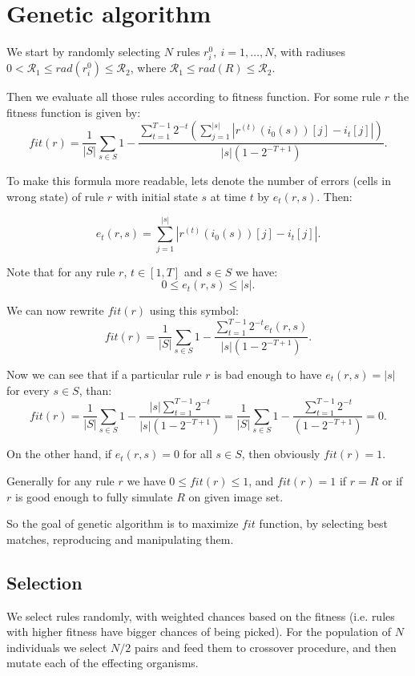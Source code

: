 \documentclass[12pt,a4paper]{article}
\begin{document}
\section{Genetic algorithm}

We start by randomly selecting $N$ rules $r^{0}_i,\ i=1,\ldots,N$,  with radiuses $0< \mathcal{R}_1 \leq rad(r^{0}_i) \leq \mathcal{R}_2$, where $\mathcal{R}_1\leq rad(R)\leq \mathcal{R}_2$. 

Then we evaluate all those rules according to fitness function. For some rule $r$ the fitness function is given by:
\[
fit(r) = \frac{1}{|S|}\sum_{s\in S} 1 - \frac{\sum_{t=1}^{T-1}  2^{-t}\left(\sum_{j=1}^{|s|} |r^{(t)}(i_0(s))[j] - i_{t}[j]|\right)}{|s|(1-2^{-T+1})}.
\]

To make this formula more readable, lets denote the number of errors (cells in wrong state) of rule $r$ with initial state $s$ at time $t$ by $e_t(r,s)$. Then:

\[ e_t(r,s) = \sum_{j=1}^{|s|} |r^{(t)}(i_0(s))[j] - i_t[j]|.\]

Note that for any rule $r$, $t\in [1,T]$ and $s\in S$ we have:
\[ 0 \leq e_t(r,s) \leq |s|. \]

We can now rewrite $fit(r)$ using this symbol:
\[
fit(r) = \frac{1}{|S|}\sum_{s\in S} 1 - \frac{\sum_{t=1}^{T-1}  2^{-t} e_t(r,s)}{|s|(1-2^{-T+1})}.
\]

Now we can see that if a particular rule $r$ is bad enough to have $e_t(r,s) = |s|$ for every $s\in S$, than:
\[
fit(r) = \frac{1}{|S|}\sum_{s\in S} 1 - \frac{|s|\sum_{t=1}^{T-1} 2^{-t}}{|s|(1-2^{-T+1})} = 
\frac{1}{|S|}\sum_{s\in S} 1 - \frac{\sum_{t=1}^{T-1} 2^{-t}}{(1-2^{-T+1})} = 0.
\]

On the other hand, if $e_t(r,s) = 0$ for all $s\in S$, then obviously $fit(r) = 1$.

Generally for any rule $r$ we have $0\leq fit(r) \leq 1$, and $fit(r) = 1$ if $r = R$ or if $r$ is good enough to fully simulate $R$ on given image set. 

So the goal of genetic algorithm is to maximize $fit$ function, by selecting best matches, reproducing and manipulating them.

\subsection{Selection}

We select rules randomly, with weighted chances based on the fitness (i.e. rules with higher fitness have bigger chances of being picked). For the population of $N$ individuals we select $N/2$ pairs and feed them to crossover procedure, and then mutate each of the effecting organisms.
\end{document}
